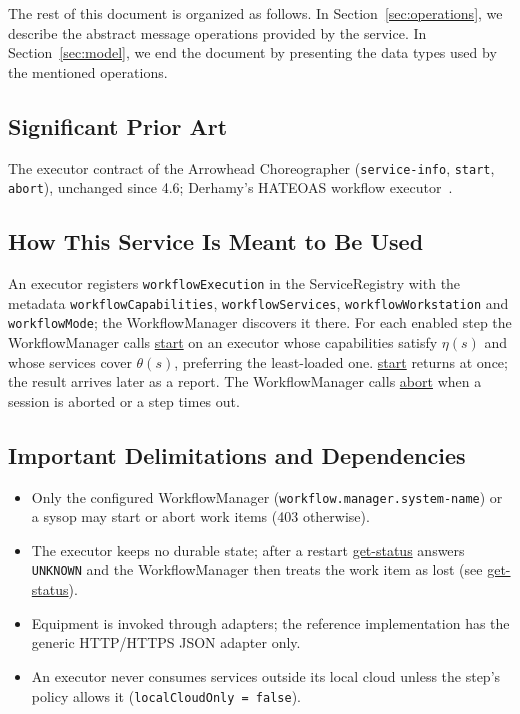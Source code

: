 \documentclass[a4paper]{arrowhead}
\newcommand{\oref}[1]{{\textcolor{ArrowheadBlue}{\hyperref[sec:operations:#1]{#1}}}}
\begin{document}
The rest of this document is organized as follows.
In Section~\ref{sec:operations}, we describe the abstract message operations provided by the service.
In Section~\ref{sec:model}, we end the document by presenting the data types used by the mentioned operations.

\subsection{Significant Prior Art}
The executor contract of the Arrowhead Choreographer (\texttt{service-info}, \texttt{start},
\texttt{abort}), unchanged since 4.6; Derhamy's HATEOAS workflow executor~\cite{derhamy2018workflow}.

\subsection{How This Service Is Meant to Be Used}
An executor registers \texttt{workflow\allowbreak{}Execution} in the ServiceRegistry with the metadata
\texttt{workflow\allowbreak{}Capabilities}, \texttt{workflow\allowbreak{}Services}, \texttt{workflow\allowbreak{}Workstation} and \texttt{workflowMode}; the
WorkflowManager discovers it there. For each enabled step the WorkflowManager calls \oref{start} on an executor whose
capabilities satisfy $\eta(s)$ and whose services cover $\theta(s)$, preferring the least-loaded one. \oref{start}
returns at once; the result arrives later as a report. The WorkflowManager calls \oref{abort} when a session is
aborted or a step times out.

\subsection{Important Delimitations and Dependencies}
\label{sec:delimitations}
\begin{itemize}
\item Only the configured WorkflowManager (\texttt{workflow.\allowbreak{}manager.\allowbreak{}system-\allowbreak{}name}) or a sysop may start or abort work items (403 otherwise).
\item The executor keeps no durable state; after a restart \oref{get-status} answers \texttt{UNKNOWN} and the WorkflowManager then treats the work item as lost (see \oref{get-status}).
\item Equipment is invoked through adapters; the reference implementation has the generic HTTP/HTTPS JSON adapter only.
\item An executor never consumes services outside its local cloud unless the step's policy allows it (\texttt{local\allowbreak{}Cloud\allowbreak{}Only = false}).
\end{itemize}
\end{document}
